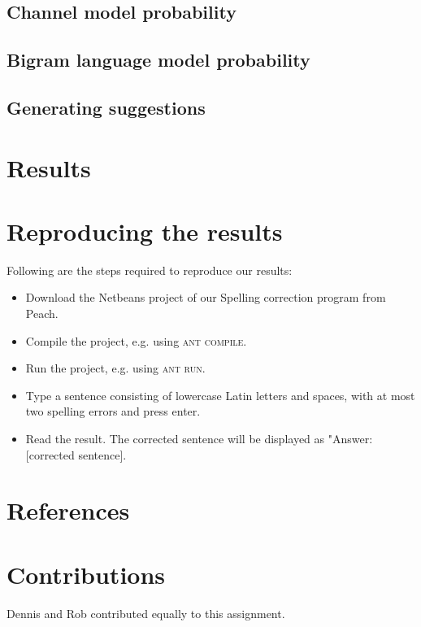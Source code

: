 \documentclass[11pt,a4paper]{article}
\begin{document}
\subsection{Channel model probability}
\subsection{Bigram language model probability}
\subsection{Generating suggestions}

\section{Results}

\section{Reproducing the results}
Following are the steps required to reproduce our results:
\begin{itemize}
\item Download the Netbeans project of our Spelling correction program from Peach.
\item Compile the project, e.g. using \textsc{ant compile}.
\item Run the project, e.g. using \textsc{ant run}.
\item Type a sentence consisting of lowercase Latin letters and spaces, with at most two spelling errors and press enter.
\item Read the result. The corrected sentence will be displayed as "Answer: [corrected sentence].
\end{itemize}

\section{References}


\section{Contributions}
Dennis and Rob contributed equally to this assignment.
\end{document}
